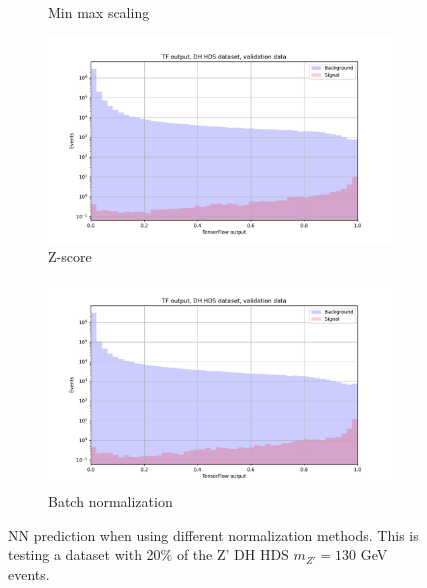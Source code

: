 \documentclass[12pt, a4paper]{book}
\begin{document}
\begin{figure}[!ht]
\begin{subfigure}[b]{0.49\textwidth}
      \caption{Min max scaling}
   \end{subfigure}
   \hfill
   \begin{subfigure}[b]{0.49\textwidth}
      \centering
      \includegraphics[width=1\textwidth]{Z_score/VAL_pre.pdf}
      \caption{Z-score}
   \end{subfigure}
   \hfill
   \begin{subfigure}[b]{0.49\textwidth}
      \centering
      \includegraphics[width=1\textwidth]{BatchNorm/VAL_pre.pdf}
      \caption{Batch normalization}
   \end{subfigure}
   \caption[Different normalization methods for NNs]{NN prediction when using different normalization methods. This is testing a dataset with 20\% of the Z' DH HDS $m_{Z'}=130$ GeV events.}\label{fig:DifferentNormalizations}
\end{figure}
\clearpage
\end{document}
